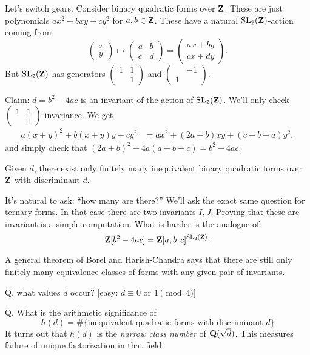Let's switch gears. Consider binary quadratic forms over $\mathbf{Z}$. These are just 
polynomials $a x^2+b x y+c y^2$ for $a,b\in \mathbf{Z}$. These have a natural 
$\operatorname{SL}_2(\mathbf{Z})$-action coming from 
\[
  \begin{pmatrix} x \\ y \end{pmatrix} \mapsto \begin{pmatrix} a & b \\ c & d \end{pmatrix} = \begin{pmatrix} a x+b y \\ c x+d y \end{pmatrix} .
\]
But $\operatorname{SL}_2(\mathbf{Z})$ has generators $\begin{pmatrix} 1 & 1 \\ & 1 \end{pmatrix}$ and 
$\begin{pmatrix} & -1 \\ 1 \end{pmatrix}$. 

Claim: $d=b^2-4 a c$ is an invariant of the action of $\operatorname{SL}_2(\mathbf{Z})$. We'll only 
check $\begin{pmatrix} 1 & 1 \\ & 1 \end{pmatrix}$-invariance. We get 
\begin{align*}
  a(x+y)^2+b (x+y)y+c y^2 
    &= a x^2 + (2 a+b)x y + (c+b+a) y^2 ,
\end{align*}
and simply check that $(2 a+b)^2 - 4 a(a+b+c)=b^2-4 a c$. 

\begin{theorem}[Gauss]
Given $d$, there exist only finitely many inequivalent binary quadratic forms 
over $\mathbf{Z}$ with discriminant $d$. 
\end{theorem}

It's natural to ask: ``how many are there?'' We'll ask the exact same question 
for ternary forms. In that case there are two invariants $I,J$. Proving that these 
are invariant is a simple computation. What is harder is the analogue of 
\[
  \mathbf{Z}[b^2-4 a c]= \mathbf{Z}[a,b,c]^{\operatorname{SL}_2(\mathbf{Z})} .
\]

A general theorem of Borel and Harish-Chandra says that there 
are still only finitely many equivalence classes of forms with any given 
pair of invariants. 

Q. what values $d$ occur? [easy: $d\equiv 0$ or $1\pmod 4$]

Q. What is the arithmetic significance of 
\[
  h(d)=\#\{\text{inequivalent quadratic forms with discriminant }d\}
\]
It turns out that $h(d)$ is the \emph{narrow class number} of $\mathbf{Q}(\sqrt d)$. 
This measures failure of unique factorization in that field. 

